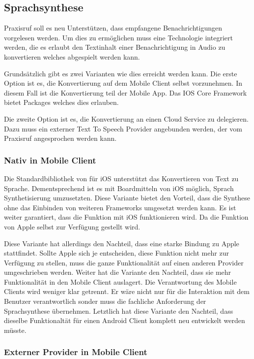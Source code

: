 \subsection{Sprachsynthese}

Praxisruf soll es neu Unterstützen, dass empfangene Benachrichtigungen vorgelesen werden.
Um dies zu ermöglichen muss eine Technologie integriert werden, die es erlaubt den Textinhalt einer Benachrichtigung
in Audio zu konvertieren welches abgespielt werden kann.

Grundsätzlich gibt es zwei Varianten wie dies erreicht werden kann.
Die erste Option ist es, die Konvertierung auf dem Mobile Client selbst vorzunehmen.
In diesem Fall ist die Konvertierung teil der Mobile App.
Das IOS Core Framework bietet Packages welches dies erlauben.

Die zweite Option ist es, die Konvertierung an einen Cloud Service zu delegieren.
Dazu muss ein externer Text To Speech Provider angebunden werden, der vom Praxisruf angesprochen werden kann.

\subsubsection*{Nativ in Mobile Client}

Die Standardbibliothek von für iOS unterstützt das Konvertieren von Text zu Sprache.\cite{ios_speech_synthesis}
Dementsprechend ist es mit Boardmitteln von iOS möglich, Sprach Synthetisierung umzusetzten.
Diese Variante bietet den Vorteil, dass die Synthese ohne das Einbinden von weiteren Frameworks umgesetzt werden kann.
Es ist weiter garantiert, dass die Funktion mit iOS funktionieren wird.
Da die Funktion von Apple selbst zur Verfügung gestellt wird.

Diese Variante hat allerdings den Nachteil, dass eine starke Bindung zu Apple stattfindet.
Sollte Apple sich je entscheiden, diese Funktion nicht mehr zur Verfügung zu stellen, muss die ganze Funktionalität
auf einen anderen Provider umgeschrieben werden.
Weiter hat die Variante den Nachteil, dass sie mehr Funktionalität in den Mobile Client auslagert.
Die Verantwortung des Mobile Clients wird weniger klar getrennt.
Er wäre nicht nur für die Interaktion mit dem Benutzer verantwortlich sonder muss die fachliche Anforderung der Sprachsynthese übernehmen.
Letztlich hat diese Variante den Nachteil, dass dieselbe Funktionaltät für einen Android Client komplett neu entwickelt werden müsste.

\subsubsection*{Externer Provider in Mobile Client}

